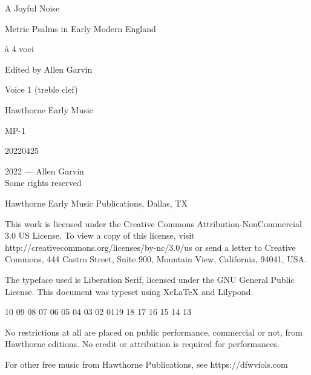 \documentclass[12pt]{memoir}
\begin{document}
\pagestyle{empty}

\vspace*{\fill}

\begin{center}
\fontsize{44pt}{44pt}\selectfont
    A Joyful Noise\par
    \vspace{1in}
    Metric Psalms in Early Modern England\par
\end{center}

\begin{center}
\fontsize{24pt}{24pt}\selectfont
à 4 voci\par
    \vspace{1in}
\end{center}

\begin{center}
\fontsize{14pt}{14pt}\selectfont
Edited by Allen Garvin\par
    \vspace{1in}
\fontsize{14pt}{14pt}\selectfont
Voice 1 (treble clef) \par
\vspace*{2mm}
\end{center}

\vspace*{\fill}

\begin{center}
Hawthorne Early Music\par
MP-1\par
20220425
\end{center}

\begingroup
\footnotesize
\setlength{\parindent}{0pt}
\setlength{\parskip}{\baselineskip}
\textcopyright{}2022 --- Allen Garvin\\
Some rights reserved

Hawthorne Early Music Publications, Dallas, TX

This work is licensed under the Creative Commons Attribution-NonCommercial 3.0 US License. To view a copy of this license, visit http://creativecommons.org/licenses/by-nc/3.0/us or send a letter to Creative Commons, 444 Castro Street, Suite 900, Mountain View, California, 94041, USA.

The typeface used is Liberation Serif, licensed under the GNU General Public License. This document was typeset using XeLaTeX and Lilypond.

\begin{center}
10 09 08 07 06 05 04 03 02 01\hspace{2em}19 18 17 16 15 14 13
\end{center}

No restrictions at all are placed on public performance, commercial or not, 
from Hawthorne editions. No credit or attribution is required for 
performances.

For other free music from Hawthorne Publications, see https://dfwviols.com
\end{document}
